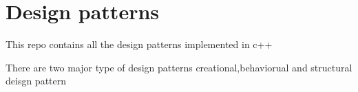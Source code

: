 \chapter{Design patterns}
\hypertarget{index}{}\label{index}
\label{index_md__2home_2sagar_2design__pattern_2README}%
%
 This repo contains all the design patterns implemented in c++

There are two major type of design patterns creational,behaviorual and structural deisgn pattern 